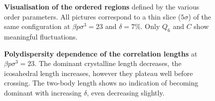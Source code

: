 \documentclass[twocolumn,superscriptaddress]{revtex4-1}
\begin{document}
\begin{figure}
	\caption{\textbf{Visualisation of the ordered regions} defined by the various order parameters. All pictures correspond to a thin slice ($5\sigma$) of the same configuration at $\beta p\sigma^3=23$ and $\delta=7\%$. Only $Q_6$ and $C$ show meaningful fluctuations.}
	\label{fig:3D}
\end{figure}

\tikzset{external/force remake=false}
\begin{figure}
	\caption{\textbf{Polydispersity dependence of the correlation lengths} at $\beta p\sigma^3=23$. The dominant crystalline length decreases, the icosahedral length increases, however they plateau well before crossing. The two-body length shows no indication of becoming dominant with increasing $\delta$, even decreasing slightly.}
	\label{fig:lengthpoly}
\end{figure}
\end{document}
